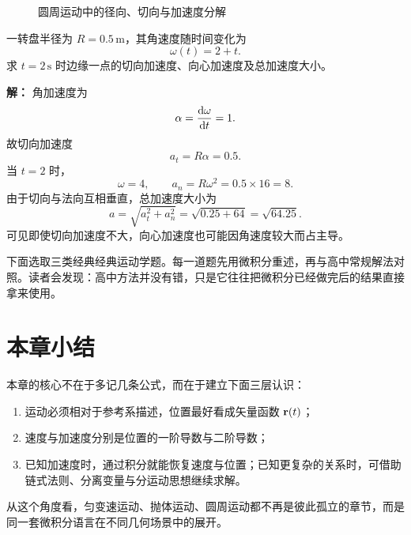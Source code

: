 \begin{figure}[H]
\centering
{}
\caption{圆周运动中的径向、切向与加速度分解}
\end{figure}

\begin{example}[转盘边缘上一点的加速度]
一转盘半径为 $R=0.5\,\text{m}$，其角速度随时间变化为
\[
 \omega(t)=2+t.
\]
求 $t=2\,\text{s}$ 时边缘一点的切向加速度、向心加速度及总加速度大小。

\textbf{解：}
角加速度为
\[
 \alpha=\dv{\omega}{t}=1.
\]
故切向加速度
\[
 a_t=R\alpha=0.5.
\]
当 $t=2$ 时，
\[
 \omega=4,
\qquad
 a_n=R\omega^2=0.5\times 16=8.
\]
由于切向与法向互相垂直，总加速度大小为
\[
 a=\sqrt{a_t^2+a_n^2}=\sqrt{0.25+64}=\sqrt{64.25}.
\]
可见即使切向加速度不大，向心加速度也可能因角速度较大而占主导。
\end{example}

下面选取三类经典经典运动学题。每一道题先用微积分重述，再与高中常规解法对照。读者会发现：高中方法并没有错，只是它往往把微积分已经做完后的结果直接拿来使用。

\section{本章小结}

本章的核心不在于多记几条公式，而在于建立下面三层认识：
\begin{enumerate}
  \item 运动必须相对于参考系描述，位置最好看成矢量函数 $\vb{r}(t)$；
  \item 速度与加速度分别是位置的一阶导数与二阶导数；
  \item 已知加速度时，通过积分就能恢复速度与位置；已知更复杂的关系时，可借助链式法则、分离变量与分运动思想继续求解。
\end{enumerate}

从这个角度看，匀变速运动、抛体运动、圆周运动都不再是彼此孤立的章节，而是同一套微积分语言在不同几何场景中的展开。

